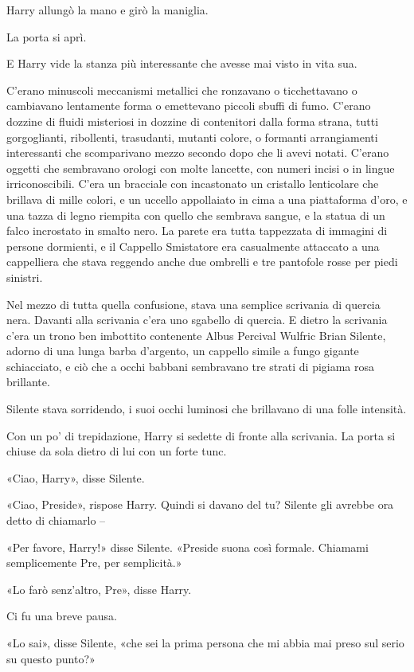 Harry allungò la mano e girò la maniglia.

La porta si aprì.

E Harry vide la stanza più interessante che avesse mai visto in vita sua.

C’erano minuscoli meccanismi metallici che ronzavano o ticchettavano o cambiavano lentamente forma o emettevano piccoli sbuffi di fumo. C’erano dozzine di fluidi misteriosi in dozzine di contenitori dalla forma strana, tutti gorgoglianti, ribollenti, trasudanti, mutanti colore, o formanti arrangiamenti interessanti che scomparivano mezzo secondo dopo che li avevi notati. C’erano oggetti che sembravano orologi con molte lancette, con numeri incisi o in lingue irriconoscibili. C’era un bracciale con incastonato un cristallo lenticolare che brillava di mille colori, e un uccello appollaiato in cima a una piattaforma d’oro, e una tazza di legno riempita con quello che sembrava sangue, e la statua di un falco incrostato in smalto nero. La parete era tutta tappezzata di immagini di persone dormienti, e il Cappello Smistatore era casualmente attaccato a una cappelliera che stava reggendo anche due ombrelli e tre pantofole rosse per piedi sinistri.

Nel mezzo di tutta quella confusione, stava una semplice scrivania di quercia nera. Davanti alla scrivania c’era uno sgabello di quercia. E dietro la scrivania c’era un trono ben imbottito contenente Albus Percival Wulfric Brian Silente, adorno di una lunga barba d’argento, un cappello simile a fungo gigante schiacciato, e ciò che a occhi babbani sembravano tre strati di pigiama rosa brillante.

Silente stava sorridendo, i suoi occhi luminosi che brillavano di una folle intensità.

Con un po’ di trepidazione, Harry si sedette di fronte alla scrivania. La porta si chiuse da sola dietro di lui con un forte tunc.

«Ciao, Harry», disse Silente.

«Ciao, Preside», rispose Harry. Quindi si davano del tu? Silente gli avrebbe ora detto di chiamarlo –

«Per favore, Harry!» disse Silente. «Preside suona così formale. Chiamami semplicemente Pre, per semplicità.»

«Lo farò senz’altro, Pre», disse Harry.

Ci fu una breve pausa.

«Lo sai», disse Silente, «che sei la prima persona che mi abbia mai preso sul serio su questo punto?»

